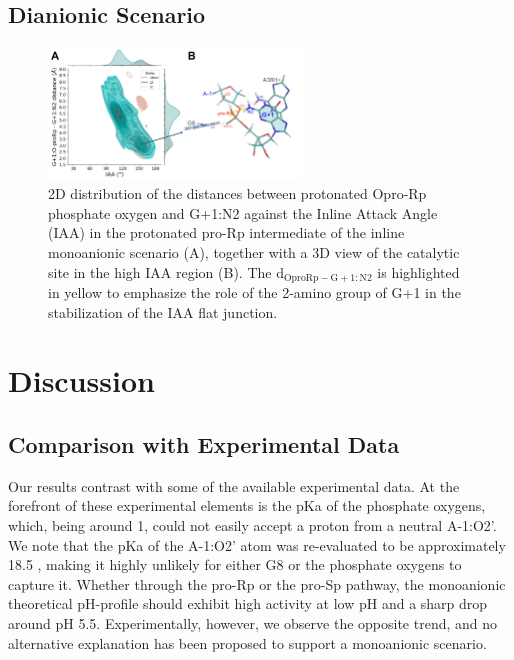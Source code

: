 \documentclass[journal=jacsat,manuscript=article]{achemso}
\begin{document}
\subsection{Dianionic Scenario}
\begin{figure}[h]
    \centering
    \includegraphics[width=0.6\textwidth]{figures/NewHbond_2D_Gp1N2O2P_3Dview}
    \caption[Correlation between IAA and d$_\mathrm{Opro-Rp-G+1:N2}$ in the Inline Monoanionic Scenario pro-Rp Intermediate]
    {2D distribution of the distances between protonated Opro-Rp phosphate oxygen and G+1:N2 against the Inline Attack Angle (IAA) in the protonated pro-Rp intermediate of the inline monoanionic scenario (A),
    together with a 3D view of the catalytic site in the high IAA region (B). The d$_\mathrm{OproRp-G+1:N2}$ 
    is highlighted in yellow to emphasize the role of the 2-amino group of G+1 in the stabilization of the IAA flat junction.}
    \label{fig:Gp1HbonApproSp}
\end{figure}


\section{Discussion}

\subsection{Comparison with Experimental Data}

Our results contrast with some of the available experimental data.
At the forefront of these experimental elements is the pKa of the phosphate oxygens,
which, being around 1, could not easily accept a proton from a neutral A-1:O2'.
We note that the pKa of the A-1:O2' atom was re-evaluated to be approximately 18.5 \cite{veenis_investigation_2021},
making it highly unlikely for either G8 or the phosphate oxygens to capture it.
Whether through the pro-Rp or the pro-Sp pathway, the monoanionic theoretical pH-profile
should exhibit high activity at low pH and a sharp drop around pH 5.5.
Experimentally, however, we observe the opposite trend,
and no alternative explanation has been proposed to support a monoanionic scenario.
\end{document}

